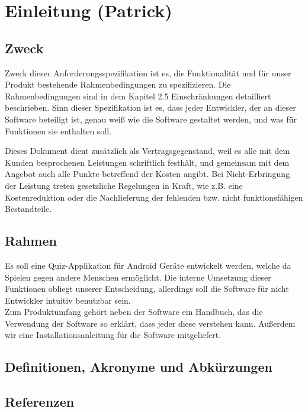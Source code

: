 \documentclass[fontsize=12pt,paper=a4,twoside]{scrartcl}
\newcommand{\highlight}[1]{\textcolor{blue}{\textbf{#1}}}
\newcommand{\nurlangversion}[0]{%
\ifthenelse{\boolean{langversion}}{\highlight{}}{\highlight{Entfällt in SWP-1}}}
\begin{document}
\section{Einleitung (Patrick)}
\nurlangversion


\subsection{Zweck}
  
Zweck dieser Anforderungsspezifikation ist es, die Funktionalität und für unser Produkt bestehende Rahmenbedingungen zu spezifizieren. Die Rahmenbedingungen sind in dem Kapitel 2.5 Einschränkungen detailliert beschrieben. Sinn dieser Spezifikation ist es, dass jeder Entwickler, der an dieser Software beteiligt ist, genau weiß wie die Software gestaltet werden, und was für Funktionen sie enthalten soll.

Dieses Dokument dient zusätzlich als Vertragsgegenstand, weil es alle mit dem Kunden besprochenen Leistungen schriftlich festhält, und gemeinsam mit dem Angebot auch alle Punkte betreffend der Kosten angibt. Bei Nicht-Erbringung der Leistung treten gesetzliche Regelungen in Kraft, wie z.B. eine Kostenreduktion oder die Nachlieferung der fehlenden
bzw. nicht funktionsfähigen Bestandteile.

\subsection{Rahmen}
  
Es soll eine Quiz-Applikation für Android Geräte entwickelt werden, welche da Spielen gegen andere Menschen ermöglicht. Die interne Umsetzung dieser Funktionen obliegt unserer Entscheidung, allerdings soll die Software für nicht Entwickler intuitiv benutzbar sein.\\

Zum Produktumfang gehört neben der Software ein Handbuch, das die Verwendung der Software so erklärt, dass jeder diese verstehen kann. Außerdem wir eine Installationsanleitung für die Software mitgeliefert.

\subsection{Definitionen, Akronyme und Abkürzungen}


\subsection{Referenzen}
 
\end{document}
